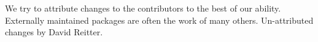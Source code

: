 \documentclass[11pt,letterpaper]{article}
\begin{document}
{\begin{figure*}[!b]
{\begin{minipage}{0.95\textwidth}
We try to attribute changes to the contributors to the best of our ability. Externally maintained packages are often the work of many others. Un-attributed changes by David Reitter.

\vspace{8pt}
\end{minipage}
~~}
\end{figure*}
}



\end{document}
